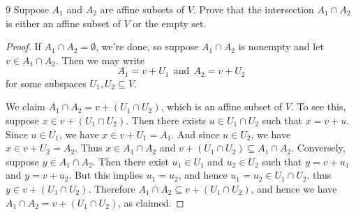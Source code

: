 \documentclass[11pt]{extarticle}
\newenvironment{problem}[1]{\begin{prob*}{#1}{}}{\end{prob*}}
\begin{document}
\begin{problem}{9}
Suppose $A_1$ and $A_2$ are affine subsets of $V$.  Prove that the intersection $A_1\cap A_2$ is either an affine subset of $V$ or the empty set.
\end{problem}
\begin{proof}
If $A_1\cap A_2 = \emptyset$, we're done, so suppose $A_1\cap A_2$ is nonempty and let $v\in A_1\cap A_2$.  Then we may write 
\begin{equation*}
A_1 = v + U_1~~\text{and}~~A_2 = v + U_2
\end{equation*}
for some subspaces $U_1,U_2\subseteq V$.  
\par We claim $A_1\cap A_2 = v + (U_1\cap U_2)$, which is an affine subset of $V$.  To see this, suppose $x \in v + (U_1\cap U_2)$.  Then there exists $u\in U_1\cap U_2$ such that $x = v + u$.  Since $u\in U_1$, we have $x \in v + U_1 = A_1$.  And since $u\in U_2$, we have $x\in v + U_2 = A_2$.  Thus $x\in A_1\cap A_2$ and $ v + (U_1\cap U_2) \subseteq A_1\cap A_2$.  Conversely, suppose $y\in A_1\cap A_2$.  Then there exist $u_1\in U_1$ and $u_2\in U_2$ such that $y = v + u_1$ and $y = v + u_2$.  But this implies $u_1= u_2$, and hence $u_1=u_2\in U_1\cap U_2$, thus $y\in v + (U_1\cap U_2)$.  Therefore $A_1\cap A_2\subseteq v + (U_1\cap U_2)$, and hence we have $A_1\cap A_2 = v + (U_1\cap U_2)$, as claimed.
\end{proof}
\end{document}
